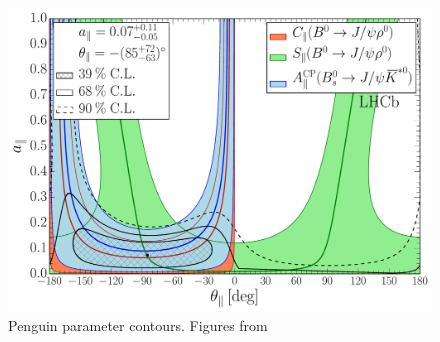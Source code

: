 \begin{figure}[h]
\begin{center}
  \includegraphics[trim=0.0cm 0.0cm 0.0cm 0.0cm, clip=true,scale=0.33]{Figures/Chapter5/Penguin_Contribution_Ang_vs_Abs_allB2VV_Para.pdf}
  \caption{Penguin parameter contours. Figures from~\cite{DeBruyn-thesis}}
  \label{pengPlot_para}
\end{center}
\end{figure}
